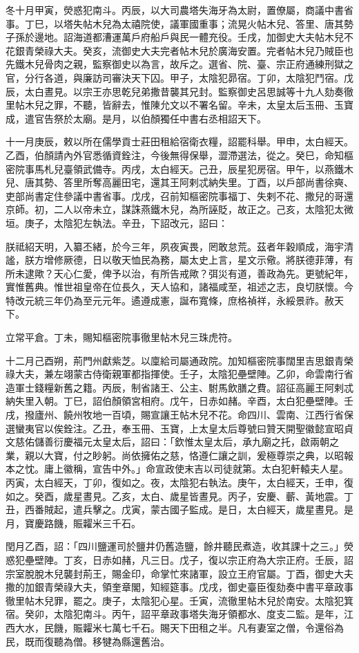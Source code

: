 \begin{pinyinscope}
 冬十月甲寅，熒惑犯南斗。丙辰，以大司農塔失海牙為太尉，置僚屬，商議中書省事。丁巳，以塔失帖木兒為太禧院使，議軍國重事；流晃火帖木兒、答里、唐其勢子孫於邊地。詔海道都漕運萬戶府船戶與民一體充役。壬戌，加御史大夫帖木兒不花銀青榮祿大夫。癸亥，流御史大夫完者帖木兒於廣海安置。完者帖木兒乃賊臣也先鐵木兒骨肉之親，監察御史以為言，故斥之。選省、院、臺、宗正府通練刑獄之官，分行各道，與廉訪司審決天下囚。甲子，太陰犯昴宿。丁卯，太陰犯鬥宿。戊辰，太白晝見。以宗王亦思乾兒弟撒昔襲其兄封。監察御史呂思誠等十九人劾奏徹里帖木兒之罪，不聽，皆辭去，惟陳允文以不署名留。辛未，太皇太后玉冊、玉寶成，遣官告祭於太廟。是月，以伯顏獨任中書右丞相詔天下。



 十一月庚辰，敕以所在儒學貢士莊田租給宿衛衣糧，詔罷科舉。甲申，太白經天。乙酉，伯顏請內外官悉循資銓注，今後無得保舉，澀滯選法，從之。癸巳，命知樞密院事馬札兒臺領武備寺。丙戌，太白經天。己丑，辰星犯房宿。甲午，以燕鐵木兒、唐其勢、答里所奪高麗田宅，還其王阿剌忒納失里。丁酉，以戶部尚書徐奭、吏部尚書定住參議中書省事。戊戌，召前知樞密院事福丁、失剌不花、撒兒的哥還京師。初，二人以帝未立，謀誅燕鐵木兒，為所誣貶，故正之。己亥，太陰犯太微垣。庚子，太陰犯左執法。辛丑，下詔改元，詔曰：



 朕祗紹天明，入纂丕緒，於今三年，夙夜寅畏，罔敢怠荒。茲者年穀順成，海宇清謐，朕方增修厥德，日以敬天恤民為務，屬太史上言，星文示儆。將朕德菲薄，有所未逮歟？天心仁愛，俾予以治，有所告戒歟？弭災有道，善政為先。更號紀年，實惟舊典。惟世祖皇帝在位長久，天人協和，諸福咸至，祖述之志，良切朕懷。今特改元統三年仍為至元元年。遹遵成憲，誕布寬條，庶格禎祥，永綏景祚。赦天下。



 立常平倉。丁未，賜知樞密院事徹里帖木兒三珠虎符。



 十二月己酉朔，荊門州獻紫芝。以廩給司屬通政院。加知樞密院事闊里吉思銀青榮祿大夫，兼左翊蒙古侍衛親軍都指揮使。壬子，太陰犯壘壁陣。乙卯，命雲南行省造軍士錢糧新舊之籍。丙辰，制省諸王、公主、駙馬飲膳之費。詔征高麗王阿剌忒納失里入朝。丁巳，詔伯顏領宮相府。戊午，日赤如赭。辛酉，太白犯壘壁陣。壬戌，撥廬州、饒州牧地一百頃，賜宣讓王帖木兒不花。命四川、雲南、江西行省保選蠻夷官以俟銓注。乙丑，奉玉冊、玉寶，上太皇太后尊號曰贊天開聖徽懿宣昭貞文慈佑儲善衍慶福元太皇太后，詔曰：「欽惟太皇太后，承九廟之托，啟兩朝之業，親以大寶，付之眇躬。尚依擁佑之慈，恪遵仁讓之訓，爰極尊崇之典，以昭報本之忱。庸上徽稱，宣告中外。」命宣政使末吉以司徒就第。太白犯軒轅夫人星。丙寅，太白經天，丁卯，復如之。夜，太陰犯右執法。庚午，太白經天，壬申，復如之。癸酉，歲星晝見。乙亥，太白、歲星皆晝見。丙子，安慶、蘄、黃地震。丁丑，西番賊起，遣兵擊之。戊寅，蒙古國子監成。是日，太白經天，歲星晝見。是月，寶慶路饑，賑糶米三千石。



 閏月乙酉，詔：「四川鹽運司於鹽井仍舊造鹽，餘井聽民煮造，收其課十之三。」熒惑犯壘壁陣。丁亥，日赤如赭，凡三日。戊子，復以宗正府為大宗正府。壬辰，詔宗室脫脫木兒襲封荊王，賜金印，命掌忙來諸軍，設立王府官屬。丁酉，御史大夫撒的加銀青榮祿大夫，領奎章閣，知經筵事。戊戌，御史臺臣復劾奏中書平章政事徹里帖木兒罪，罷之。庚子，太陰犯心星。壬寅，流徹里帖木兒於南安。太陰犯箕宿。癸卯，太陰犯南斗。丙午，詔平章政事塔失海牙領都水、度支二監。是年，江西大水，民饑，賑糶米七萬七千石。賜天下田租之半。凡有妻室之僧，令還俗為民，既而復聽為僧。移犍為縣還舊治。



\end{pinyinscope}